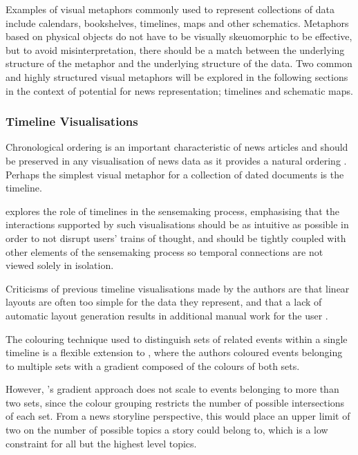 Examples of visual metaphors commonly used to represent collections of data include calendars, bookshelves, timelines, maps and other schematics. Metaphors based on physical objects do not have to be visually skeuomorphic to be effective, but to avoid misinterpretation, there should be a match between the underlying structure of the metaphor and the underlying structure of the data. Two common and highly structured visual metaphors will be explored in the following sections in the context of potential for news representation; timelines and schematic maps.

\subsubsection{Timeline Visualisations}

Chronological ordering is an important characteristic of news articles and should be preserved in any visualisation of news data as it provides a natural ordering \citep{StructuredSummarizationForNewsEvents}. Perhaps the simplest visual metaphor for a collection of dated documents is the timeline.

\citep{SchemaLine} explores the role of timelines in the sensemaking process,  emphasising that the interactions supported by such visualisations should be as intuitive as possible in order to not disrupt users' trains of thought, and should be tightly coupled with other elements of the sensemaking process so temporal connections are not viewed solely in isolation.

Criticisms of previous timeline visualisations made by the authors are that linear layouts  are often too simple for the data they represent, and that a lack of automatic layout generation results in additional manual work for the user \citep{SchemaLine}.

The colouring technique used to distinguish sets of related events within a single timeline is a flexible extension to \citep{TimeSets}, where the authors coloured events belonging to multiple sets with a gradient composed of the colours of both sets. 

However, \citep{SchemaLine}'s gradient approach does not scale to events belonging to more than two sets, since the colour grouping restricts the number of possible intersections of each set. From a news storyline perspective, this would place an upper limit of two on the number of possible topics a story could belong to, which is a low constraint for all but the highest level topics.

